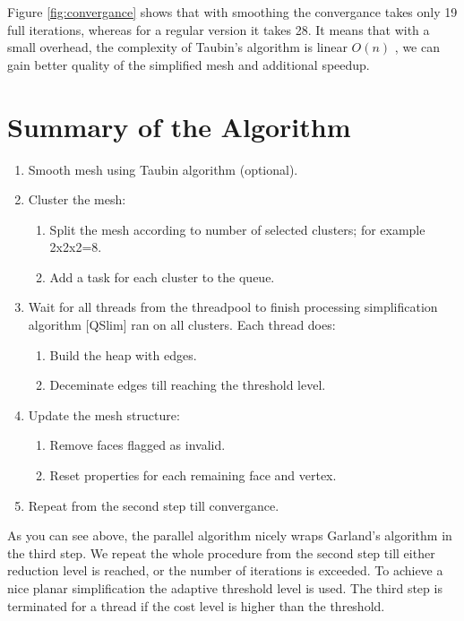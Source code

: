Figure \ref{fig:convergance} shows that with smoothing the convergance takes only 19 full iterations, whereas for a regular version it takes 28. It means that with a small overhead, the complexity of Taubin's algorithm is linear $O(n)$ \cite{taubin95}, we can gain better quality of the simplified mesh and additional speedup.

\newpage
\section{Summary of the Algorithm}

\begin{enumerate}
\item Smooth mesh using Taubin algorithm (optional).
\item Cluster the mesh:
\begin{enumerate}
\item Split the mesh according to number of selected clusters; for example 2x2x2=8.
\item Add a task for each cluster to the queue.
\end{enumerate}
\item Wait for all threads from the threadpool to finish processing simplification algorithm [QSlim] ran on all clusters. Each thread does:
\begin{enumerate}
\item Build the heap with edges.
\item Deceminate edges till reaching the threshold level.
\end{enumerate}
\item Update the mesh structure:
\begin{enumerate}
\item Remove faces flagged as invalid.
\item Reset properties for each remaining face and vertex.
\end{enumerate}
\item Repeat from the second step till convergance.
\end{enumerate}

As you can see above, the parallel algorithm nicely wraps Garland's algorithm in the third step. We repeat the whole procedure from the second step till either reduction level is reached, or the number of iterations is exceeded. To achieve a nice planar simplification the adaptive threshold level is used. The third step is terminated for a thread if the cost level is higher than the threshold.

